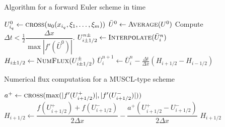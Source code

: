 \documentclass{article}
\newcommand{\minmod}{ \text{minmod} }
\begin{document}
\begin{algorithm}
\caption{Algorithm for a forward Euler scheme in time} \label{algo:euler}
\begin{algorithmic}
        \State $U^0_{i_q} \gets \Call{cross}{u_0(x_{i_q},\xi_1,\dots,\xi_m)}$
    \EndFor
    \State $\bar U^0 \gets \Call{Average}{U^0}$
    \State Compute $\Delta t < \frac{1}{2} \dfrac{\Delta x}{\max |f'(\bar U^0)|}$. 
            \State $U^{n  \pm}_{i \pm 1/2} \gets \Call{Interpolate}{\bar U_i^n } $ 
            \State $H_{i\pm 1/2} \gets \Call{NumFlux}{U^\pm_{i\pm1/2}}$ 
            \State $\bar U_i^{n +1} \gets \bar U_i^n  - \frac{\Delta t }{\Delta x}(H_{i+1/2}-H_{i-1/2})$
        \EndFor
    \EndFor
\end{algorithmic}
\end{algorithm}

\begin{algorithm}
    \caption{Numerical flux computation for a MUSCL-type scheme} \label{algo:muscl}
\begin{algorithmic}
	    \State $a^+ \gets \Call{cross}{\max(|f'(U_{i+1/2}^+)|, |f'(U_{i+1/2}^-)|)}$
        \State
	    \State $H_{i+1/2} \gets \dfrac{f(U_{i+1/2}^+) + f(U_{i+1/2}^-)}{2 \Delta x}
            - \dfrac{a^+ (U_{i+1/2}^+ - U_{i+1/2}^-)}{2 \Delta x}$
        \State \Return $H_{i+1/2}$
\end{algorithmic}
\end{algorithm}
\end{document}
